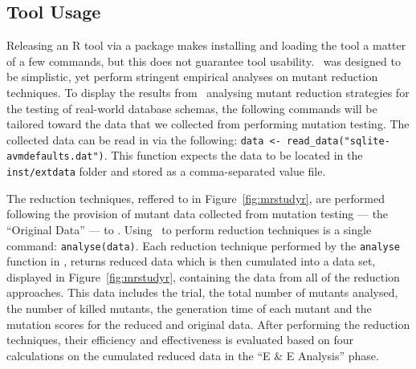 \subsection{Tool Usage}





Releasing an R tool via a package makes installing and loading the tool a matter of a few commands,
but this does not guarantee tool usability. \mr~was designed to be simplistic, yet perform stringent
empirical analyses on mutant reduction techniques. To display the results from \mr~analysing mutant
reduction strategies for the testing of real-world database schemas, the following commands will be
tailored toward the data that we collected from performing mutation testing. The collected data can
be read in via the following: {\small\texttt{data <- read\_data("sqlite-avmdefaults.dat")}}. This
function expects the data to be located in the \texttt{inst/extdata} folder and stored as a
comma-separated value file.






The reduction techniques, reffered to in Figure~\ref{fig:mrstudyr}, are performed following the provision of mutant data collected from mutation testing ---
the ``Original Data'' --- to \mr. Using \mr~to perform  reduction techniques is a single command:
\texttt{analyse(data)}. Each reduction technique performed by the \texttt{analyse} function in \mr, returns
reduced data which is then cumulated into a data set, displayed in Figure~\ref{fig:mrstudyr}, containing the data from all of the reduction approaches.
This data includes the trial, the total number of mutants analysed, the number of
killed mutants, the generation time of each mutant and the mutation scores for the reduced and
original data. After performing the reduction techniques, their efficiency and effectiveness is evaluated based
on four calculations on the cumulated reduced data in the ``E \& E Analysis'' phase.

